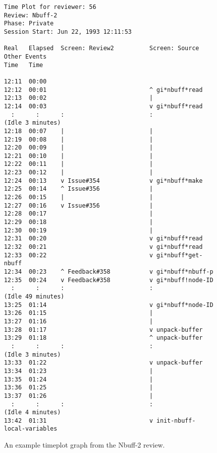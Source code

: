 \begin{itemizenoindent}
\begin{figure}                                        
\small
\begin{verbatim}
Time Plot for reviewer: 56
Review: Nbuff-2
Phase: Private
Session Start: Jun 22, 1993 12:11:53

Real   Elapsed  Screen: Review2          Screen: Source           Other Events
Time   Time

12:11  00:00                                                      
12:12  00:01                             ^ gi*nbuff*read          
12:13  00:02                             |                        
12:14  00:03                             v gi*nbuff*read          
  :      :      :                        :                        (Idle 3 minutes)
12:18  00:07    |                        |                        
12:19  00:08    |                        |                        
12:20  00:09    |                        |                        
12:21  00:10    |                        |                        
12:22  00:11    |                        |                        
12:23  00:12    |                        |                        
12:24  00:13    v Issue#354              v gi*nbuff*make          
12:25  00:14    ^ Issue#356              |                        
12:26  00:15    |                        |                        
12:27  00:16    v Issue#356              |                        
12:28  00:17                             |                        
12:29  00:18                             |                        
12:30  00:19                             |                        
12:31  00:20                             v gi*nbuff*read          
12:32  00:21                             v gi*nbuff*read          
12:33  00:22                             v gi*nbuff*get-nbuff     
12:34  00:23    ^ Feedback#358           v gi*nbuff*nbuff-p       
12:35  00:24    v Feedback#358           v gi*nbuff!node-ID       
  :      :      :                        :                        (Idle 49 minutes)
13:25  01:14                             v gi*nbuff*node-ID       
13:26  01:15                             |                        
13:27  01:16                             |                        
13:28  01:17                             v unpack-buffer          
13:29  01:18                             ^ unpack-buffer          
  :      :      :                        :                        (Idle 3 minutes)
13:33  01:22                             v unpack-buffer          
13:34  01:23                             |                        
13:35  01:24                             |                        
13:36  01:25                             |                        
13:37  01:26                             |                        
  :      :      :                        :                        (Idle 4 minutes)
13:42  01:31                             v init-nbuff-local-variables  
\end{verbatim}
\normalsize
\caption{An example timeplot graph from the Nbuff-2 review.}
\label{fig:timeplot}
\end{figure}


\end{itemizenoindent}
